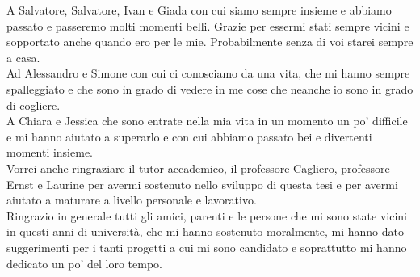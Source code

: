 A Salvatore, Salvatore, Ivan e Giada con cui siamo sempre insieme e abbiamo passato e passeremo molti momenti belli. Grazie per essermi stati sempre vicini e sopportato anche quando ero per le mie. Probabilmente senza di voi starei sempre a casa.\\

Ad Alessandro e Simone con cui ci conosciamo da una vita, che mi hanno sempre spalleggiato e che sono in grado di vedere in me cose che neanche io sono in grado di cogliere.\\

A Chiara e Jessica che sono entrate nella mia vita in un momento un po’ difficile e mi hanno aiutato a superarlo e con cui abbiamo passato bei e divertenti momenti insieme.\\

Vorrei anche ringraziare il tutor accademico, il professore Cagliero, professore Ernst e Laurine per avermi sostenuto nello sviluppo di questa tesi e per avermi aiutato a maturare a livello personale e lavorativo.\\

Ringrazio in generale tutti gli amici, parenti e le persone che mi sono state vicini in questi anni di università, che mi hanno sostenuto moralmente, mi hanno dato suggerimenti per i tanti progetti a cui mi sono candidato e soprattutto mi hanno dedicato un po’ del loro tempo.


\clearpage

\paginavuota
